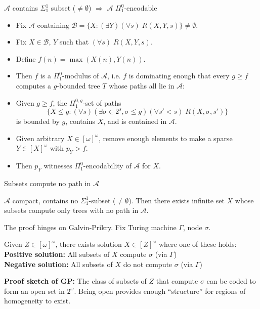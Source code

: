 \begin{frame}{$\mathcal{A}$ contains $\Sigma_1^1$ subset ($\neq\emptyset$)
$\Rightarrow$ $\mathcal{A}$ $\Pi_1^0$-encodable}
  \begin{itemize}
    \item Fix $\mathcal{A}$ containing $\mathcal{B} =\{X: (\exists
      Y)(\forall s)\; R(X,Y,s)\} \neq\emptyset$.
    \item Fix $X\in\mathcal{B}$, $Y$ such that $(\forall s)\;R(X,Y,s)$.
    \item Define $f(n)=\max(X(n),Y(n))$.
    \item Then $f$ is a $\Pi_1^0$-modulus of $\mathcal{A}$, i.e. $f$ is
      dominating enough that every $g\geq f$ computes a $g$-bounded tree
      $T$ whose paths all lie in $\mathcal{A}$:
    \item Given $g\geq f$, the $\Pi_1^{0,g}$-set of paths
      \[\{X\leq g:(\forall s)(\exists \sigma\in 2^s, \sigma\leq g)(\forall
      s'<s)\; R(X,\sigma,s')\}\]
      is bounded by $g$, contains $X$, and is contained in $\mathcal{A}$.
    \item Given arbitrary $X\in[\omega]^\omega$, remove enough elements to
      make a sparse $Y\in[X]^\omega$ with $p_Y>f$.
    \item Then $p_Y$ witnesses $\Pi_1^0$-encodability of $\mathcal{A}$ for
      $X$.
  \end{itemize}
\end{frame}

\begin{frame}{Subsets compute no path in $\mathcal{A}$}
  \begin{main-thm*}
    $\mathcal{A}$ compact, contains no $\Sigma_1^1$-subset
    ($\neq\emptyset$). Then there exists infinite set $X$ whose subsets
    compute only trees with no path in $\mathcal{A}$.
  \end{main-thm*}

  The proof hinges on Galvin-Prikry. Fix Turing machine $\Gamma$, node
  $\sigma$.
  \begin{Fact}
    Given $Z\in[\omega]^\omega$, there exists solution $X\in[Z]^\omega$
    where one of these holds:\\
    \textbf{Positive solution:} All subsets of $X$ compute $\sigma$
    (via $\Gamma$)\\
    \textbf{Negative solution:} All subsets of $X$ do not compute $\sigma$
    (via $\Gamma$)
  \end{Fact}
  \textbf{Proof sketch of GP:} The class of subsets of $Z$ that
  compute $\sigma$ can be coded to form an open set in $2^\omega$. Being
  open provides enough ``structure'' for regions of homogeneity to exist.
\end{frame}

